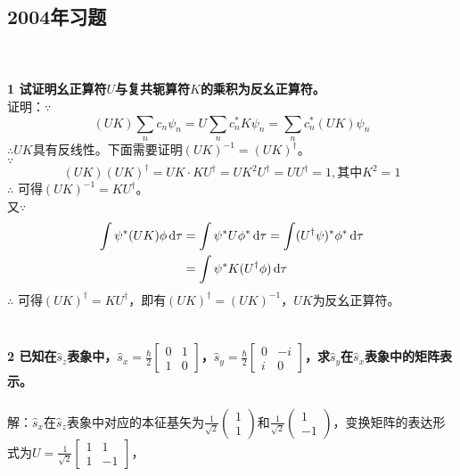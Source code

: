 \documentclass[12pt]{article}
\numberwithin{equation}{section}	 %
\begin{document}
\begin{spacing}{1.5}
\subsection{2004年习题}
~\\
~\\
\textbf{1 \quad 试证明幺正算符$U$与复共轭算符$K$的乘积为反幺正算符。}\\
证明：$\because$		 %
\begin{equation}
(UK)\sum_{n}c_{n}\psi_{n} = U\sum_{n}c^{*}_{n}K\psi_{n} = \sum_{n}c^{*}_{n}(UK)\psi_{n}
\end{equation}
$\therefore UK$具有反线性。下面需要证明$(UK)^{-1} = (UK)^{\dagger}$。\\
$\because$
\begin{equation}\nonumber 		%
(UK)(UK)^{\dagger} = UK \cdot KU^{\dagger} = UK^{2}U^{\dagger} = UU^{\dagger} = 1,\text{其中}K^{2}=1
\end{equation}
$\therefore$ 可得$(UK)^{-1} = KU^{\dagger}$。\\
又$\because$
\begin{equation}
\begin{aligned}
\int \psi^{*}(UK)\phi\mathop{}\!\mathrm{d}\tau &= \int \psi^{*}U\phi^{*}\mathop{}\!\mathrm{d}\tau = \int (U^{\dagger}\psi)^{*}\phi^{*}\mathop{}\!\mathrm{d}\tau \\
&= \int \psi^{*}K(U^{\dagger}\phi)\mathop{}\!\mathrm{d}\tau
\end{aligned}
\end{equation}
$\therefore$ 可得$(UK)^{\dagger} = KU^{\dagger}$，即有$(UK)^{\dagger} = (UK)^{-1}$，$UK$为反幺正算符。\\
~\\
~\\
\textbf{2 \quad 已知在$\hat{s}_{z}$表象中，$\displaystyle \hat{s}_{x}=\frac{\hbar}{2} \begin{bmatrix} 0 & 1 \\ 1 & 0 \end{bmatrix}$，$\displaystyle \hat{s}_{y}=\frac{\hbar}{2} \begin{bmatrix} 0 & -i \\ i & 0 \end{bmatrix}$，求$\hat{s}_{y}$在$\hat{s}_{x}$表象中的矩阵表示。}\\
~\\
解：$\hat{s}_{x}$在$\hat{s}_{z}$表象中对应的本征基矢为$\displaystyle \frac{1}{\sqrt{2}}\begin{pmatrix} 1 \\ 1 \end{pmatrix} \text{和} \frac{1}{\sqrt{2}}\begin{pmatrix} 1 \\ -1 \end{pmatrix}$，变换矩阵的表达形式为$\displaystyle U=\frac{1}{\sqrt{2}} \begin{bmatrix} 1 & 1 \\ 1 & -1 \end{bmatrix}$，\\

\end{spacing}
\end{document}
